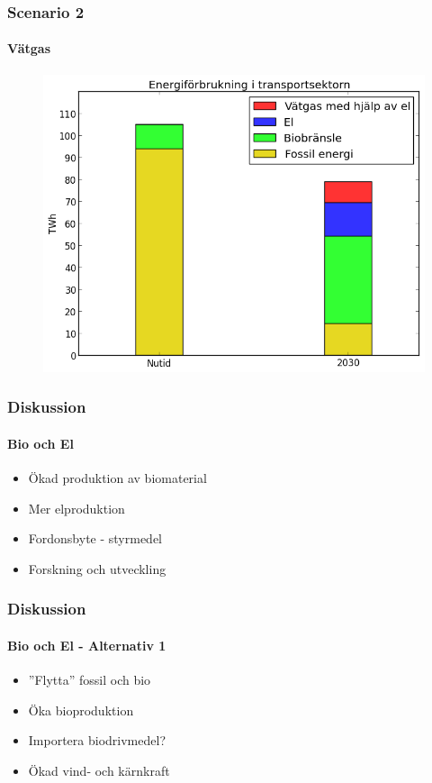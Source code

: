 \documentclass{beamer}
\begin{document}
\begin{frame}
	\frametitle{Scenario 2}
	\framesubtitle{Vätgas}
		\begin{figure}[h!]
	       \centering
	       \includegraphics[scale=0.4]{scen2transport.png}
		\end{figure}
\end{frame}


\begin{frame}
	\frametitle{Diskussion}
	\framesubtitle{Bio och El}
	\begin{itemize}
		\item Ökad produktion av biomaterial
		\item Mer elproduktion
		\item Fordonsbyte - styrmedel
		\item Forskning och utveckling
	\end{itemize}
\end{frame}

\begin{frame}
	\frametitle{Diskussion}
	\framesubtitle{Bio och El - Alternativ 1}
	\begin{itemize}
		\item{''Flytta'' fossil och bio}
		\item{Öka bioproduktion}
		\item{Importera biodrivmedel?}
		\item{Ökad vind- och kärnkraft}
	\end{itemize}
\end{frame}
\end{document}
